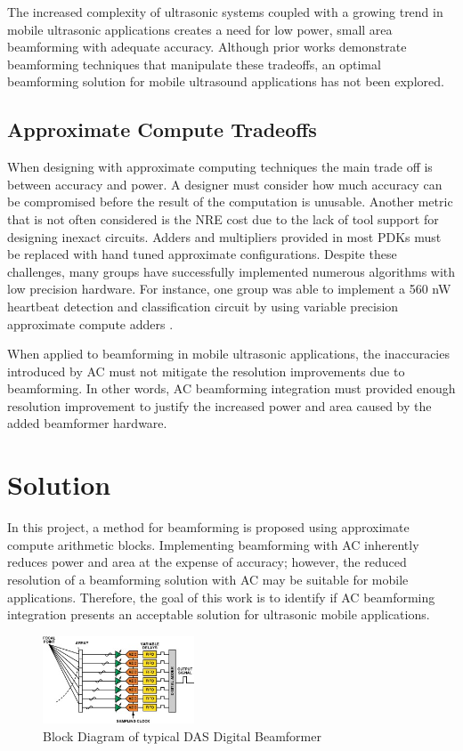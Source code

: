 \documentclass[journal]{IEEEtran}
\begin{document}
The increased complexity of ultrasonic systems coupled with a growing trend in mobile ultrasonic applications creates a need for low power, small area beamforming with adequate accuracy. Although prior works demonstrate beamforming techniques that manipulate these tradeoffs, an optimal beamforming solution for mobile ultrasound applications has not been explored. 

\subsection{Approximate Compute Tradeoffs}
When designing with approximate computing techniques the main trade off is between accuracy and power. A designer must consider how much accuracy can be compromised before the result of the computation is unusable. Another metric that is not often considered is the NRE cost due to the lack of tool support for designing inexact circuits. Adders and multipliers provided in most PDKs must be replaced with hand tuned approximate configurations. Despite these challenges, many groups have successfully implemented numerous algorithms with low precision hardware. For instance, one group was able to implement a 560 \si{\nano\watt} heartbeat detection and classification circuit by using variable precision approximate compute adders \cite{amirtharajah2004micropower}.

When applied to beamforming in mobile ultrasonic applications, the inaccuracies introduced by AC must not mitigate the resolution improvements due to beamforming. In other words, AC beamforming integration must provided enough resolution improvement to justify the increased power and area caused by the added beamformer hardware. 

\section{Solution}

In this project, a method for beamforming is proposed using approximate compute arithmetic blocks. Implementing beamforming with AC inherently reduces power and area at the expense of accuracy; however, the reduced resolution of a beamforming solution with AC may be suitable for mobile applications. Therefore, the goal of this work is to identify if AC beamforming integration presents an acceptable solution for ultrasonic mobile applications.

\begin{figure}
    \centering
    \includegraphics[width=0.4\textwidth]{beamform.jpg}
    \caption{Block Diagram of typical DAS Digital Beamformer}
    \label{fig:beamform}
\end{figure}
\end{document}
